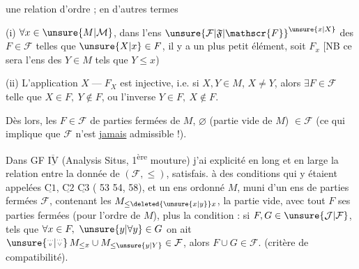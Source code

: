une relation d'ordre ; en d'autres termes

(i) $\forall x\in\unsure{M|\mathcal{M}}$, dans l'ens ${\unsure{\mathcal{F}|\mathfrak{F}|\mathscr{F}}}^{\unsure{x|X}}$ des $F\in\mathcal{F}$ telles que $\unsure{X|x}\in F$, il y a un plus petit élément, soit $F_{x}$ [NB ce sera l'ens des $Y\in M$ tels que $Y\leq x$)

(ii) L'application $X\mathrel{\text{---}}F_{X}$ est injective, i.e. si $X,Y\in M$, $X\ne Y$, alors $\exists F\in\mathcal{F}$ telle que $X\in F,\ Y\notin F$, ou l'inverse $Y\in F,\ X\notin F$.

Dès lors, les $F\in\mathcal{F}$   de parties fermées de $M$,    $\varnothing$ (partie vide de $M$) $\in\mathcal{F}$ (ce qui implique que $\mathcal{F}$ n'est \uline{jamais} admissible !).

Dans GF $\overline{\underline{\mathrm{IV}}}$ (Analysis Situs, 1\textsuperscript{ère} mouture) j'ai explicité en long et en large la relation entre la donnée de $(\mathcal{F},\leq)$, satisfais. à des conditions qui y étaient appelées $\underline{\mathrm{C1}}$, $\underline{\mathrm{C2}}$ $\underline{\mathrm{C3}}$ ( 53 54, 58),
 et un ens ordonné $M$, muni d'un ens de parties fermées $\mathcal{F}$, contenant les $M_{\leq\deleted{\unsure{x|y}}x}$, la partie vide,  avec tout $F$ ses parties fermées (pour l'ordre de $M$), plus la condition : si $F,G\in\unsure{\mathcal{J}|\mathcal{F}}$, tels que $\forall x\in F,\ \unsure{y|\forall y}\in G$ on ait $\unsure{\overset{\scriptscriptstyle\cdots}{\scriptscriptstyle v}|\overset{\scriptscriptstyle\cdots}{\scriptscriptstyle\vee}}\,M_{\leq x}\cup M_{\leq\unsure{y|Y}}\in\mathcal{F}$, alors $F\cup G\in\mathcal{F}$. (critère de compatibilité).
